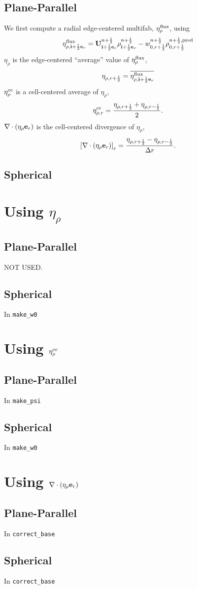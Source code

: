 \documentclass[11pt]{article}
\def\half   {\frac{1}{2}}
\def\eb         {{\bf e}}
\def\ib         {{\bf i}}
\def\Ub         {{\bf U}}
\def\etarho     {\eta_\rho}
\def\etarhocc   {\etarho^{\rm cc}}
\def\divetarho  {\nabla\cdot(\etarho\eb_r)}
\begin{document}
\subsection{Plane-Parallel}
We first compute a radial edge-centered multifab, $\eta_{\rho}^{\rm flux}$, using
\begin{equation}
\eta_{\rho,\ib+\half\eb_r}^{\rm flux} = \Ub_{\ib+\half\eb_r}^{n+\half} \rho_{\ib+\half\eb_r}^{n+\half} - w_{0,r+\half}^{n+\half}\rho_{0,r+\half}^{n+\half, {\rm pred}}
\end{equation}
$\etarho$ is the edge-centered ``average'' value of $\eta_{\rho}^{\rm flux}$,
\begin{equation}
\eta_{\rho,r+\half} = \overline{\eta_{\rho,\ib+\half\eb_r}^{\rm flux}}
\end{equation}
$\etarhocc$ is a cell-centered average of $\etarho$,
\begin{equation}
\eta_{\rho,r}^{\rm cc} = \frac{\eta_{\rho,r+\half} + \eta_{\rho,r-\half}}{2}.
\end{equation}
$\divetarho$ is the cell-centered divergence of $\etarho$,
\begin{equation}
\left[\divetarho\right]_r = \frac{\eta_{\rho,r+\half} - \eta_{\rho,r-\half}}{\Delta r}.
\end{equation}
\subsection{Spherical}
\section{Using $\etarho$}
\subsection{Plane-Parallel}
NOT USED.
\subsection{Spherical}
In {\tt make\_w0}
\section{Using $\etarhocc$}
\subsection{Plane-Parallel}
In {\tt make\_psi}
\subsection{Spherical}
In {\tt make\_w0}
\section{Using $\divetarho$}
\subsection{Plane-Parallel}
In {\tt correct\_base}
\subsection{Spherical}
In {\tt correct\_base}
\end{document}
